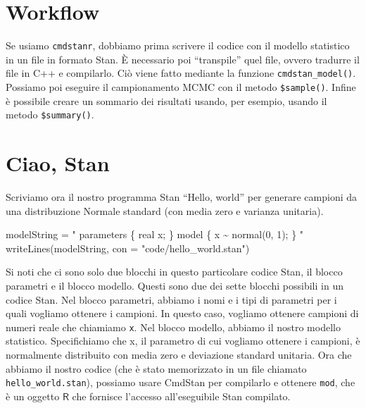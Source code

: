 \documentclass[
  11pt,
]{krantz}
\makeatletter
\newenvironment{Shaded}{\begin{snugshade}}{\end{snugshade}}
\newcommand{\AttributeTok}[1]{\textcolor[rgb]{0.61,0.61,0.61}{#1}}
\newcommand{\FunctionTok}[1]{\textcolor[rgb]{0,0,0}{#1}}
\newcommand{\NormalTok}[1]{#1}
\newcommand{\OtherTok}[1]{\textcolor[rgb]{0.37,0.37,0.37}{#1}}
\newcommand{\StringTok}[1]{\textcolor[rgb]{0.5,0.5,0.5}{#1}}
\newenvironment{kframe}{%
\medskip{}
\setlength{\fboxsep}{.8em}
 \def\at@end@of@kframe{}%
 \ifinner\ifhmode%
  \def\at@end@of@kframe{\end{minipage}}%
  \begin{minipage}{\columnwidth}%
 \fi\fi%
 \def\FrameCommand##1{\hskip\@totalleftmargin \hskip-\fboxsep
 \colorbox{shadecolor}{##1}\hskip-\fboxsep
     \hskip-\linewidth \hskip-\@totalleftmargin \hskip\columnwidth}%
 \MakeFramed {\advance\hsize-\width
   \@totalleftmargin\z@ \linewidth\hsize
   \@setminipage}}%
 {\par\unskip\endMakeFramed%
 \at@end@of@kframe}
\renewenvironment{Shaded}{\begin{kframe}}{\end{kframe}}
\newcommand{\R}{\textsf{R}} %
\theoremstyle{definition}
\theoremstyle{definition}
\theoremstyle{definition}
\theoremstyle{definition}
\theoremstyle{remark}
\makeatother
\begin{document}
\hypertarget{workflow}{%
\section{Workflow}\label{workflow}}

Se usiamo \texttt{cmdstanr}, dobbiamo prima scrivere il codice con il modello statistico in un file in formato Stan. È necessario poi ``transpile'' quel file, ovvero tradurre il file in C++ e compilarlo. Ciò viene fatto mediante la funzione \texttt{cmdstan\_model()}. Possiamo poi eseguire il campionamento MCMC con il metodo \texttt{\$sample()}. Infine è possibile creare un sommario dei risultati usando, per esempio, usando il metodo \texttt{\$summary()}.

\hypertarget{ciao-stan}{%
\section{Ciao, Stan}\label{ciao-stan}}

Scriviamo ora il nostro programma Stan ``Hello, world'' per generare campioni da una distribuzione Normale standard (con media zero e varianza unitaria).

\begin{Shaded}
\begin{Highlighting}[]
\NormalTok{modelString }\OtherTok{=} \StringTok{"}
\StringTok{parameters \{}
\StringTok{  real x;}
\StringTok{\}}
\StringTok{model \{}
\StringTok{  x \textasciitilde{} normal(0, 1);}
\StringTok{\}}
\StringTok{"}
\FunctionTok{writeLines}\NormalTok{(modelString, }\AttributeTok{con =} \StringTok{"code/hello\_world.stan"}\NormalTok{)}
\end{Highlighting}
\end{Shaded}

Si noti che ci sono solo due blocchi in questo particolare codice Stan, il blocco parametri e il blocco modello. Questi sono due dei sette blocchi possibili in un codice Stan. Nel blocco parametri, abbiamo i nomi e i tipi di parametri per i quali vogliamo ottenere i campioni. In questo caso, vogliamo ottenere campioni di numeri reale che chiamiamo \texttt{x}. Nel blocco modello, abbiamo il nostro modello statistico. Specifichiamo che x, il parametro di cui vogliamo ottenere i campioni, è normalmente distribuito con media zero e deviazione standard unitaria. Ora che abbiamo il nostro codice (che è stato memorizzato in un file chiamato \texttt{hello\_world.stan}), possiamo usare CmdStan per compilarlo e ottenere \texttt{mod}, che è un oggetto \(\R\) che fornisce l'accesso all'eseguibile Stan compilato.
\end{document}
